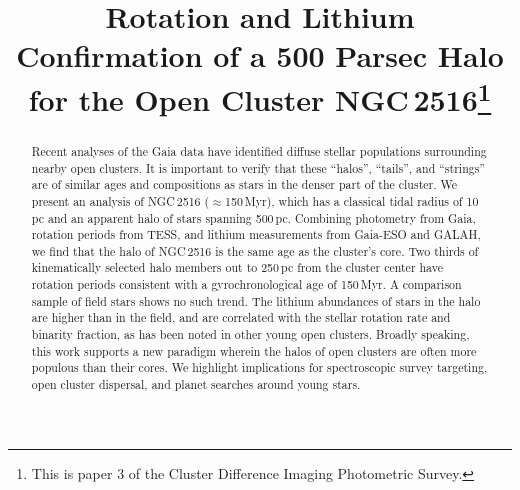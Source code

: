 \documentclass[12pt,twocolumn,tighten]{aastex63}
\begin{document}

\title{
  Rotation and Lithium Confirmation of a 500 Parsec Halo for the Open
  Cluster NGC\,2516\footnote{This is paper 3 of the Cluster Difference
  Imaging Photometric Survey.}
}



%
%
\begin{abstract}
  Recent analyses of the Gaia data have identified diffuse stellar
  populations surrounding nearby open clusters.  It is important to
  verify that these ``halos'', ``tails'', and ``strings'' are of
  similar ages and compositions as stars in the denser part of the
  cluster.  We present an analysis of NGC\,2516 ($\approx$150\,Myr),
  which has a classical tidal radius of 10\,pc and an apparent halo of
  stars spanning 500\,pc.  Combining photometry from Gaia, rotation
  periods from TESS, and lithium measurements from Gaia-ESO and GALAH,
  we find that the halo of NGC\,2516 is the same age as the cluster's
  core.  Two thirds of kinematically selected halo members out to
  250\,pc from the cluster center have rotation periods consistent
  with a gyrochronological age of 150\,Myr.  A comparison sample of
  field stars shows no such trend.  The lithium abundances of stars in
  the halo are higher than in the field, and are correlated with the
  stellar rotation rate and binarity fraction, as has been
  noted in other young open clusters.  Broadly speaking,
  this work supports a new paradigm wherein the halos of open clusters
  are often more populous than their cores.  We highlight implications
  for spectroscopic survey targeting, open cluster dispersal, and
  planet searches around young stars.
\end{abstract}


\end{document}
